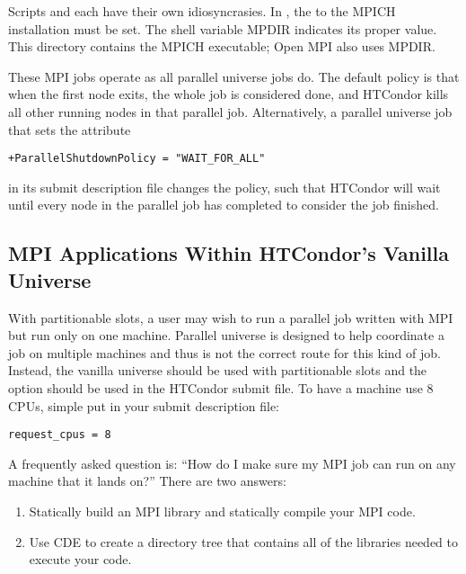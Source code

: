 Scripts  and 
each have their own idiosyncrasies.
In , the  to the MPICH installation must be set.
The shell variable MPDIR indicates its proper value.
This directory contains the MPICH  executable; Open MPI also
uses MPDIR.

These MPI jobs operate as all parallel universe jobs do.
The default policy is that when the first node exits,
the whole job is considered done, 
and HTCondor kills all other running nodes in that parallel job.
Alternatively, a parallel universe job that sets the attribute
\begin{verbatim}
+ParallelShutdownPolicy = "WAIT_FOR_ALL"
\end{verbatim}
in its submit description file changes the policy,
such that HTCondor will wait until every node in the parallel 
job has completed to consider the job finished. 


\subsection{\label{sec:parallel-mpi-submit-single}MPI Applications Within HTCondor's Vanilla Universe}

With partitionable slots, a user may wish to run a parallel job written with
MPI but run only on one machine. Parallel universe is designed to help 
coordinate a job on multiple machines and thus is not the correct route for
this kind of job. Instead, the vanilla universe should be used with partitionable
slots and the  option should be used in the HTCondor submit
file. To have a machine use 8 CPUs, simple put in your submit description file:

\begin{verbatim}
request_cpus = 8
\end{verbatim}

A frequently asked question is: ``How do I make sure my MPI job can run 
on any machine that it lands on?'' There are two answers:
\begin{enumerate}
\item Statically build an MPI library and statically compile your MPI code.
\item Use CDE to create a directory tree that contains all of the libraries 
needed to execute your code.
\end{enumerate}

